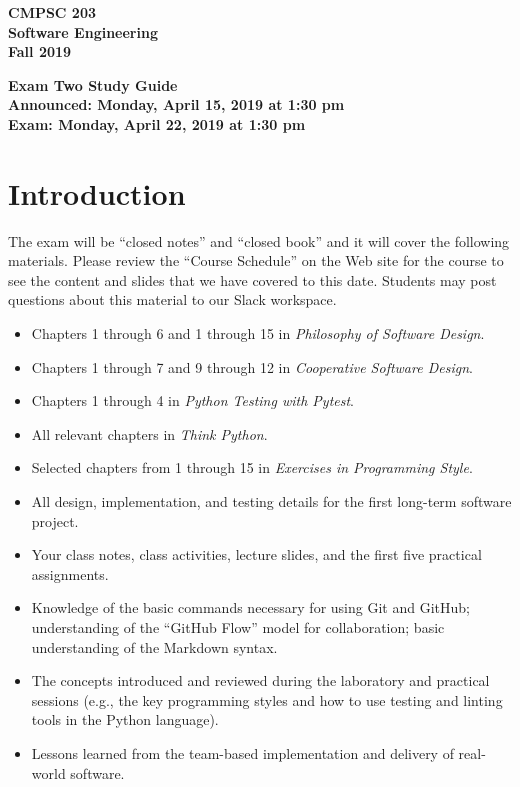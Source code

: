 \documentclass[11pt]{article}
\newcommand{\assignmentduedate}{April 22}
\newcommand{\assignmentassignedate}{April 15}
\newcommand{\assignmentnumber}{Two}
\newcommand{\labyear}{2019}
\newcommand{\assignedday}{Monday}
\newcommand{\dueday}{Monday}
\newcommand{\labtime}{1:30 pm}
\newcommand{\assigneddate}{Announced: \assignedday, \assignmentassignedate, \labyear{} at \labtime{}}
\newcommand{\duedate}{Exam: \dueday, \assignmentduedate, \labyear{} at \labtime{}}
\newcommand{\cooperative}{{\em Cooperative Software Design\/}}
\newcommand{\philosophy}{{\em Philosophy of Software Design\/}}
\newcommand{\thinkpython}{{\em Think Python\/}}
\newcommand{\programmingstyle}{{\em Exercises in Programming Style\/}}
\newcommand{\pytest}{{\em Python Testing with Pytest\/}}
\newcommand{\guidetitle}[1]
{
  \begin{center}
    \begin{center}
      \bf
      CMPSC 203\\Software Engineering\\
      Fall 2019\\
      \medskip
    \end{center}
    \bf
    #1
  \end{center}
}
\begin{document}
\thispagestyle{empty}

\guidetitle{Exam \assignmentnumber{} Study Guide \\ \assigneddate{} \\ \duedate{}}

\section*{Introduction}

\noindent The exam will be ``closed notes'' and ``closed book'' and it will
cover the following materials. Please review the ``Course Schedule'' on the Web
site for the course to see the content and slides that we have covered to this
date. Students may post questions about this material to our Slack workspace.

\vspace*{-.5em}
\begin{itemize}

  \itemsep 0.025in

  \item Chapters 1 through 6 and 1 through 15 in \philosophy{}.

  \item Chapters 1 through 7 and 9 through 12 in \cooperative{}.

  \item Chapters 1 through 4 in \pytest{}.

  \item All relevant chapters in \thinkpython{}.

  \item Selected chapters from 1 through 15 in \programmingstyle{}.

  \item All design, implementation, and testing details for the first long-term
    software project.

  \item Your class notes, class activities, lecture slides, and the first five
    practical assignments.

  \item Knowledge of the basic commands necessary for using Git and GitHub;
    understanding of the ``GitHub Flow'' model for collaboration; basic
    understanding of the Markdown syntax.

  \item The concepts introduced and reviewed during the laboratory and practical
    sessions (e.g., the key programming styles and how to use testing and
    linting tools in the Python language).

  \item Lessons learned from the team-based implementation and delivery of
    real-world software.

\end{itemize}
\vspace*{-.5em}
\end{document}
